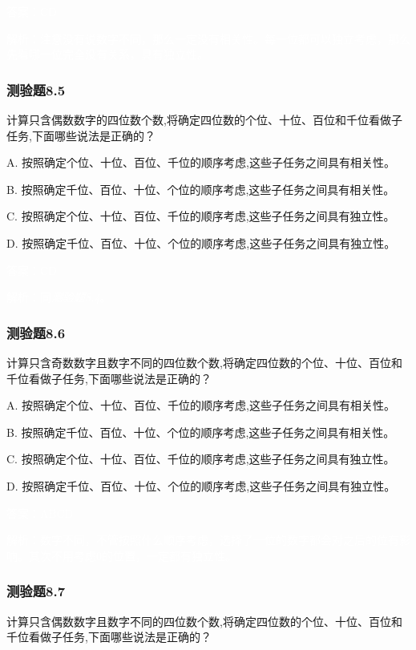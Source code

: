 \documentclass[UTF8, heading=true]{ctexart}
\begin{document}
\textcolor{white}{答案：CD}

\textcolor{white}{解析：注意没有说数字不同，那么一定没有相关性。每一位都可以独立考虑，那么先看哪一位完全没有关系，具有独立性。}


\subsubsection{测验题8.5}

计算只含偶数数字的四位数个数,将确定四位数的个位、十位、百位和千位看做子任务,下面哪些说法是正确的？

A. 按照确定个位、十位、百位、千位的顺序考虑,这些子任务之间具有相关性。

B. 按照确定千位、百位、十位、个位的顺序考虑,这些子任务之间具有相关性。

C. 按照确定个位、十位、百位、千位的顺序考虑,这些子任务之间具有独立性。

D. 按照确定千位、百位、十位、个位的顺序考虑,这些子任务之间具有独立性。

\textcolor{white}{答案：CD}

\textcolor{white}{解析：同\textit{测验题8.4}。}

\subsubsection{测验题8.6}

计算只含奇数数字且数字不同的四位数个数,将确定四位数的个位、十位、百位和千位看做子任务,下面哪些说法是正确的？

A. 按照确定个位、十位、百位、千位的顺序考虑,这些子任务之间具有相关性。

B. 按照确定千位、百位、十位、个位的顺序考虑,这些子任务之间具有相关性。

C. 按照确定个位、十位、百位、千位的顺序考虑,这些子任务之间具有独立性。

D. 按照确定千位、百位、十位、个位的顺序考虑,这些子任务之间具有独立性。

\textcolor{white}{答案：ABCD}

\textcolor{white}{解析：数字不同，不管按照什么顺序考虑，选择了一位的数字都会对之后的位有影响。其次不用考虑0的位置，一定都有独立性。}

\subsubsection{测验题8.7}
计算只含偶数数字且数字不同的四位数个数,将确定四位数的个位、十位、百位和千位看做子任务,下面哪些说法是正确的？
\end{document}
